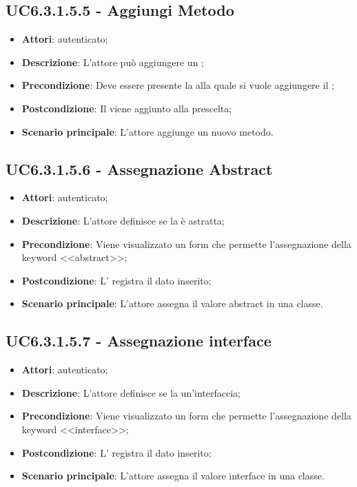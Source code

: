 \subsection{UC6.3.1.5.5 - Aggiungi Metodo}
\label{ssec:UC6.3.1.5.5}
\begin{itemize}
\item \textbf{Attori}:  autenticato;
\item \textbf{Descrizione}: L'attore può aggiungere un ;
\item \textbf{Precondizione}: Deve essere presente la  alla quale si vuole aggiungere il ;
\item \textbf{Postcondizione}: Il  viene aggiunto alla  prescelta;
\item \textbf{Scenario principale}: L'attore aggiunge un nuovo metodo.
\end{itemize}
\subsection{UC6.3.1.5.6 - Assegnazione Abstract}
\label{ssec:UC6.3.1.5.6}
\begin{itemize}
\item \textbf{Attori}:  autenticato;
\item \textbf{Descrizione}: L'attore definisce se la  è astratta;
\item \textbf{Precondizione}: Viene visualizzato un form che permette l'assegnazione della keyword <<abstract>>;
\item \textbf{Postcondizione}: L' registra il dato inserito;
\item \textbf{Scenario principale}: L'attore assegna il valore abstract in una classe.
\end{itemize}
\subsection{UC6.3.1.5.7 - Assegnazione interface}
\label{ssec:UC6.3.1.5.7}
\begin{itemize}
\item \textbf{Attori}:  autenticato;
\item \textbf{Descrizione}: L'attore definisce se la  un'interfaccia;
\item \textbf{Precondizione}: Viene visualizzato un form che permette l'assegnazione della keyword <<interface>>;
\item \textbf{Postcondizione}: L' registra il dato inserito;
\item \textbf{Scenario principale}: L'attore assegna il valore interface in una classe.
\end{itemize}
